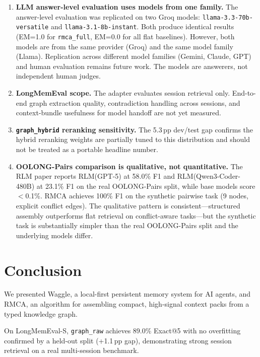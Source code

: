 \documentclass[conference]{IEEEtran}
\begin{document}
\begin{enumerate}
\item \textbf{LLM answer-level evaluation uses models from one family.}
The answer-level evaluation was replicated on two Groq models: \texttt{llama-3.3-70b-versatile}
and \texttt{llama-3.1-8b-instant}. Both produce identical results (EM=1.0 for \texttt{rmca\_full},
EM=0.0 for all flat baselines). However, both models are from the same provider (Groq) and
the same model family (Llama). Replication across different model families (Gemini, Claude,
GPT) and human evaluation remains future work. The models are answerers, not independent
human judges.

\item \textbf{LongMemEval scope.} The adapter evaluates session retrieval only. End-to-end
graph extraction quality, contradiction handling across sessions, and context-bundle
usefulness for model handoff are not yet measured.

\item \textbf{\texttt{graph\_hybrid} reranking sensitivity.} The 5.3\,pp dev/test gap
confirms the hybrid reranking weights are partially tuned to this distribution and should
not be treated as a portable headline number.

\item \textbf{OOLONG-Pairs comparison is qualitative, not quantitative.}
The RLM paper reports RLM(GPT-5) at 58.0\% F1 and RLM(Qwen3-Coder-480B) at 23.1\% F1 on
the real OOLONG-Pairs split, while base models score $<$0.1\%. RMCA achieves 100\% F1 on
the synthetic pairwise task (9 nodes, explicit conflict edges). The qualitative pattern is
consistent---structured assembly outperforms flat retrieval on conflict-aware tasks---but
the synthetic task is substantially simpler than the real OOLONG-Pairs split and the
underlying models differ.
\end{enumerate}

\section{Conclusion}

We presented Waggle, a local-first persistent memory system for AI agents, and RMCA,
an algorithm for assembling compact, high-signal context packs from a typed knowledge graph.

On LongMemEval-S, \texttt{graph\_raw} achieves 89.0\% Exact@5 with no overfitting
confirmed by a held-out split (+1.1\,pp gap), demonstrating strong session retrieval
on a real multi-session benchmark.
\end{document}
